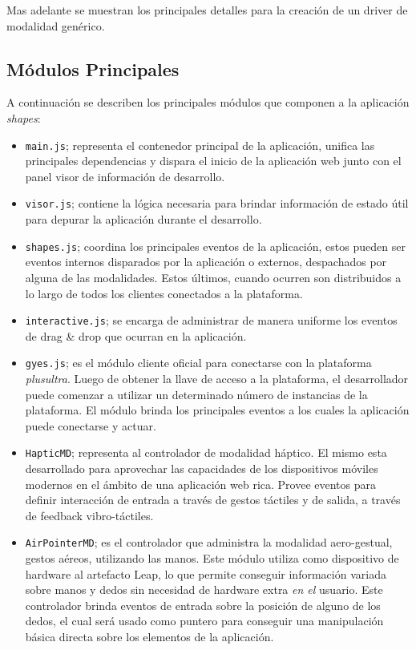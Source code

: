 Mas adelante se muestran los principales detalles para la creación de un driver de modalidad genérico. 

\subsection{Módulos Principales}

A continuación se describen los principales módulos que componen a la aplicación \emph{shapes}:
\begin{itemize}
\item \texttt{main.js}; representa el contenedor principal de la aplicación, unifica las principales dependencias y dispara el inicio de la aplicación web junto con el panel visor de información de desarrollo.

\item \texttt{visor.js}; contiene la lógica necesaria para brindar información de estado útil para depurar la aplicación durante el desarrollo.

\item \texttt{shapes.js}; coordina los principales eventos de la aplicación, estos pueden ser eventos internos disparados por la aplicación o externos, despachados por alguna de las modalidades. Estos últimos, cuando ocurren son distribuidos a lo largo de todos los clientes conectados a la plataforma.

\item \texttt{interactive.js}; se encarga de administrar de manera uniforme los eventos de drag \& drop que ocurran en la aplicación.

\item \texttt{gyes.js}; es el módulo cliente oficial para conectarse con la plataforma \emph{plusultra}. Luego de obtener la llave de acceso a la plataforma, el desarrollador puede comenzar a utilizar un determinado número de instancias de la plataforma. El módulo brinda los principales eventos a los cuales la aplicación puede conectarse y actuar.

\item \texttt{HapticMD}; representa al controlador de modalidad háptico. El mismo esta desarrollado para aprovechar las capacidades de los dispositivos móviles modernos en el ámbito de una aplicación web rica. Provee eventos para definir interacción de entrada a través de gestos táctiles y de salida, a través de feedback vibro-táctiles.

\item \texttt{AirPointerMD}; es el controlador que administra la modalidad aero-gestual, \ie gestos aéreos, utilizando las manos. Este módulo utiliza como dispositivo de hardware al artefacto Leap, lo que permite conseguir información variada sobre manos y dedos sin necesidad de hardware extra \emph{en el} usuario. Este controlador brinda eventos de entrada sobre la posición de alguno de los dedos, el cual será usado como puntero para conseguir una manipulación básica directa sobre los elementos de la aplicación.
\end{itemize}

